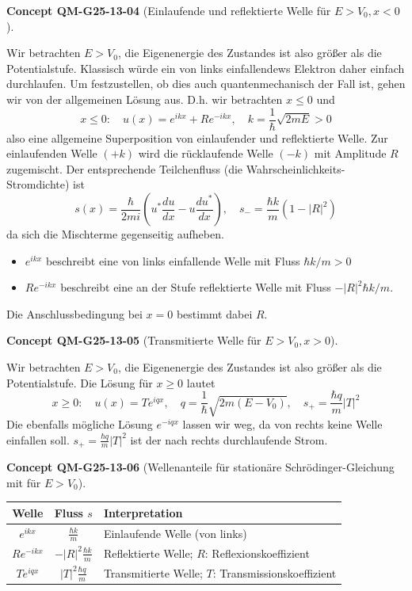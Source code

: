\documentclass[10pt, letterpaper]{article}
\newcommand{\CustomHeading}[3]{%
  \par\medskip\noindent%
  \textbf{#1 #2} \textnormal{(#3)}.\enskip%
}
\newenvironment{CONC}[2]{\CustomHeading{Concept}{#1}{#2}}{}
\begin{document}
\begin{CONC}{QM-G25-13-04}{Einlaufende und reflektierte Welle für $E>V_0, x<0$}
Wir betrachten $E>V_{0}$, die Eigenenergie des Zustandes ist also größer als die Potentialstufe. Klassisch würde ein von links einfallendews Elektron daher einfach durchlaufen. Um festzustellen, ob dies auch quantenmechanisch der Fall ist, gehen wir von der allgemeinen Lösung aus. D.h. wir betrachten $x \leq 0$ und
$$
x \leq 0: \quad u(x)=e^{i k x}+R e^{-i k x}, \quad k=\frac{1}{\hbar} \sqrt{2 m E}>0
$$
also eine allgemeine Superposition von einlaufender und reflektierte Welle. Zur einlaufenden Welle $(+k)$ wird die rücklaufende Welle $(-k)$ mit Amplitude $R$ zugemischt. Der entsprechende Teilchenfluss (die Wahrscheinlichkeits-Stromdichte) ist
$$
s(x)=\frac{\hbar}{2 m i}\left(u^{*} \frac{d u}{d x}-u \frac{d u^{*}}{d x}\right), \quad s_{-}=\frac{\hbar k}{m}\left(1-|R|^{2}\right)
$$
da sich die Mischterme gegenseitig aufheben.
\begin{itemize}
  \item $e^{i k x}$ beschreibt eine von links einfallende Welle mit Fluss $\hbar k / m>0$
  \item $R e^{-i k x}$ beschreibt eine an der Stufe reflektierte Welle mit Fluss $-|R|^{2} \hbar k / m$.
\end{itemize}
Die Anschlussbedingung bei $x=0$ bestimmt dabei $R$.
\end{CONC}

\begin{CONC}{QM-G25-13-05}{Transmitierte Welle für $E>V_0, x>0$}
Wir betrachten $E>V_{0}$, die Eigenenergie des Zustandes ist also größer als die Potentialstufe. Die Lösung für $x \geq 0$ lautet
$$
x \geq 0: \quad u(x)=T e^{i q x}, \quad q=\frac{1}{\hbar} \sqrt{2 m\left(E-V_{0}\right)}, \quad s_{+}=\frac{\hbar q}{m}|T|^{2}
$$
Die ebenfalls mögliche Lösung $e^{-i q x}$ lassen wir weg, da von rechts keine Welle einfallen soll. $s_{+}=\frac{\hbar q}{m}|T|^{2}$ ist der nach rechts durchlaufende Strom.
\end{CONC}

\begin{CONC}{QM-G25-13-06}{Wellenanteile für stationäre Schrödinger-Gleichung mit  für $E>V_0$}
\begin{center}
\renewcommand{\arraystretch}{1.3}
\begin{tabular}{|c|c|l|}
\hline
\textbf{Welle} & \textbf{Fluss $s$} & \textbf{Interpretation} \\
\hline
$e^{i k x}$ & $\frac{\hbar k}{m}$ & Einlaufende Welle (von links) \\
$R e^{-i k x}$ & $-|R|^{2} \frac{\hbar k}{m}$ & Reflektierte Welle; $R$: Reflexionskoeffizient \\
$T e^{i q x}$ & $|T|^{2} \frac{\hbar q}{m}$ & Transmitierte Welle; $T$: Transmissionskoeffizient \\
\hline
\end{tabular}
\end{center}
\end{CONC}
\end{document}

